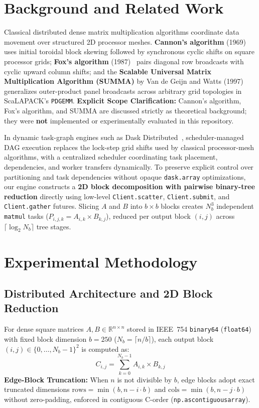 \documentclass[11pt,a4paper]{article}
\begin{document}
\section{Background and Related Work}
Classical distributed dense matrix multiplication algorithms coordinate data movement over structured 2D processor meshes. \textbf{Cannon's algorithm} (1969)~\cite{Cannon1969} uses initial toroidal block skewing followed by synchronous cyclic shifts on square processor grids; \textbf{Fox's algorithm} (1987)~\cite{Fox1987} pairs diagonal row broadcasts with cyclic upward column shifts; and the \textbf{Scalable Universal Matrix Multiplication Algorithm (SUMMA)} by Van de Geijn and Watts (1997)~\cite{VanDeGeijn1997} generalizes outer-product panel broadcasts across arbitrary grid topologies in ScaLAPACK's \texttt{PDGEMM}. \textbf{Explicit Scope Clarification:} Cannon's algorithm, Fox's algorithm, and SUMMA are discussed strictly as theoretical background; they were \textbf{not} implemented or experimentally evaluated in this repository.

In dynamic task-graph engines such as Dask Distributed~\cite{Rocklin2015}, scheduler-managed DAG execution replaces the lock-step grid shifts used by classical processor-mesh algorithms, with a centralized scheduler coordinating task placement, dependencies, and worker transfers dynamically. To preserve explicit control over partitioning and task dependencies without opaque \texttt{dask.array} optimizations, our engine constructs a \textbf{2D block decomposition with pairwise binary-tree reduction} directly using low-level \texttt{Client.scatter}, \texttt{Client.submit}, and \texttt{Client.gather} futures. Slicing $A$ and $B$ into $b \times b$ blocks creates $N_b^3$ independent \texttt{matmul} tasks ($P_{i, j, k} = A_{i, k} \times B_{k, j}$), reduced per output block $(i, j)$ across $\lceil \log_2 N_b \rceil$ tree stages.

\section{Experimental Methodology}

\subsection{Distributed Architecture and 2D Block Reduction}
For dense square matrices $A, B \in \mathbb{R}^{n \times n}$ stored in IEEE~754 \texttt{binary64} (\texttt{float64}) with fixed block dimension $b = 250$ ($N_b = \lceil n / b \rceil$), each output block $(i, j) \in \{0, \dots, N_b - 1\}^2$ is computed as:
\begin{equation}
C_{i, j} = \sum_{k=0}^{N_b - 1} A_{i, k} \times B_{k, j}
\end{equation}
\noindent\textbf{Edge-Block Truncation:} When $n$ is not divisible by $b$, edge blocks adopt exact truncated dimensions $\text{rows} = \min(b, n - i \cdot b)$ and $\text{cols} = \min(b, n - j \cdot b)$ without zero-padding, enforced in contiguous C-order (\texttt{np.ascontiguousarray}).
\end{document}
